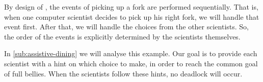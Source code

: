 By design of \TOPHAT, the events of picking up a fork are performed sequentially.
That is, when one computer scientist decides to pick up his right fork, we will handle that event first.
After that, we will handle the choices from the other scientists.
So, the order of the events is explicitly determined by the scientists themselves.

In \cref{sub:assistive-dining} we will analyse this example.
Our goal is to provide each scientist with a hint on which choice to make, in order to reach the common goal of full bellies.
When the scientists follow these hints, no deadlock will occur.
